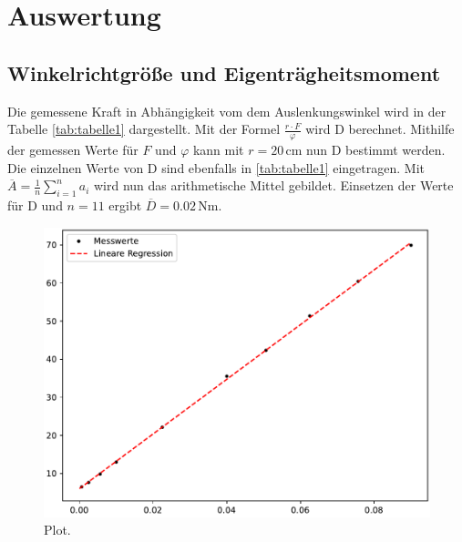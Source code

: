 \section{Auswertung}
\label{sec:Auswertung}
  \subsection{Winkelrichtgröße und Eigenträgheitsmoment}
  Die gemessene Kraft in Abhängigkeit vom dem Auslenkungswinkel wird in der Tabelle \ref{tab:tabelle1} dargestellt.
  Mit der Formel $\frac{r\cdot F}{\varphi}$ wird D berechnet.
  Mithilfe der gemessen Werte für $F$ und $\varphi$ kann mit $r = 20 \, \unit{\centi\meter}$ nun D bestimmt werden.
  Die einzelnen Werte von D sind ebenfalls in \ref{tab:tabelle1} eingetragen. 
  Mit $\overline{A} = \frac{1}{n} \sum_{i = 1}^{n} a_i$ wird nun das arithmetische Mittel gebildet. %
Einsetzen der Werte für D und $n = 11$ ergibt $\overline{D} = 0.02 \, \unit{\newton\meter}$.






\begin{figure}
  \centering
  \includegraphics{plot.pdf}
  \caption{Plot.}
  \label{fig:plot}
\end{figure}

